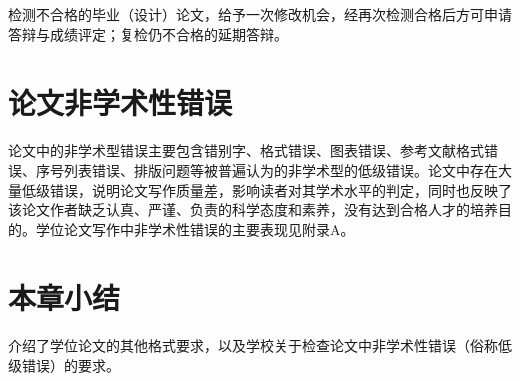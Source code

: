 检测不合格的毕业（设计）论文，给予一次修改机会，经再次检测合格后方可申请答辩与成绩评定；复检仍不合格的延期答辩。

\section{论文非学术性错误}
论文中的非学术型错误主要包含错别字、格式错误、图表错误、参考文献格式错误、序号列表错误、排版问题等被普遍认为的非学术型的低级错误。论文中存在大量低级错误，说明论文写作质量差，影响读者对其学术水平的判定，同时也反映了该论文作者缺乏认真、严谨、负责的科学态度和素养，没有达到合格人才的培养目的。学位论文写作中非学术性错误的主要表现见附录A。

\section{本章小结}
介绍了学位论文的其他格式要求，以及学校关于检查论文中非学术性错误（俗称低级错误）的要求。

\newpage\quad %






